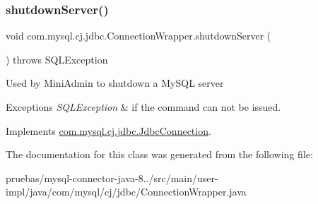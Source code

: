 \subsubsection{\texorpdfstring{shutdown\+Server()}{shutdownServer()}}
{\footnotesize\ttfamily void com.\+mysql.\+cj.\+jdbc.\+Connection\+Wrapper.\+shutdown\+Server (\begin{DoxyParamCaption}{ }\end{DoxyParamCaption}) throws S\+Q\+L\+Exception}

Used by Mini\+Admin to shutdown a My\+S\+QL server


\begin{DoxyExceptions}{Exceptions}
{\em S\+Q\+L\+Exception} & if the command can not be issued. \\
\hline
\end{DoxyExceptions}


Implements \mbox{\hyperlink{interfacecom_1_1mysql_1_1cj_1_1jdbc_1_1_jdbc_connection_ad9bedf228ed2ec194197ac2ceb960a94}{com.\+mysql.\+cj.\+jdbc.\+Jdbc\+Connection}}.



The documentation for this class was generated from the following file\+:\begin{DoxyCompactItemize}
\item 
pruebas/mysql-\/connector-\/java-\/8../src/main/user-\/impl/java/com/mysql/cj/jdbc/Connection\+Wrapper.\+java\end{DoxyCompactItemize}
